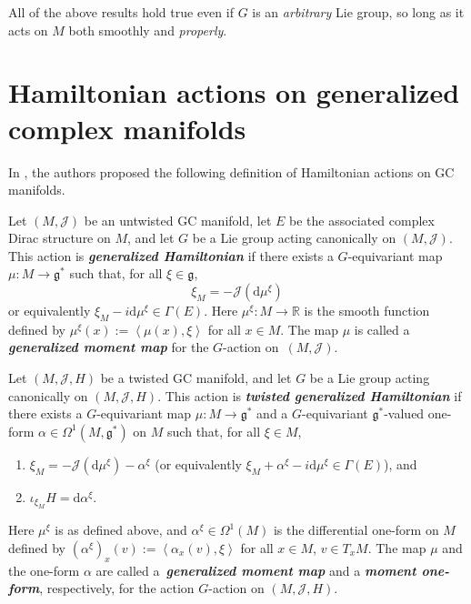 \documentclass[11pt]{article}
\numberwithin{equation}{section}
\newcommand{\deff}[1]{\textbf{\emph{#1}}}
\newcommand{\func}[3]{#1 \colon #2 \to #3}
\newcommand{\tang}{T}
\newcommand{\iprod}[2]{\left\langle {#1} , {#2} \right\rangle}
\begin{document}
\begin{Remark}
All of the above results hold true even if $G$ is an \emph{arbitrary} Lie group, so long as it acts on $M$ both smoothly and \emph{properly}.
\end{Remark}


\section{Hamiltonian actions on generalized complex manifolds}\label{section3}


In \cite{lintolman}, the authors proposed the following def\/inition of Hamiltonian actions on GC manifolds.


\begin{Definition}
\label{genhamactiondef}

Let $(M,\mathcal{J})$ be an untwisted GC manifold, let $E$ be the associated complex Dirac structure on $M$, and let $G$ be a Lie group acting canonically on $(M,\mathcal{J})$.  This action is \deff{generalized Hamiltonian} if there exists a $G$-equivariant map $\func{\mu}{M}{\mathfrak{g}^{\ast}}$ such that, for all $\xi \in \mathfrak{g}$,
\[
  \xi_M = - \mathcal{J} ( \mathrm{d} \mu^{\xi} )
\]
or equivalently $\xi_M - i \mathrm{d} \mu^{\xi} \in \Gamma(E)$.
Here $\func{\mu^{\xi}}{M}{\mathbb{R}}$ is the smooth function def\/ined by $\mu^{\xi}(x) := \iprod{\mu(x)}{\xi}$ for all $x \in M$.  The map $\mu$ is called a \deff{generalized moment map} for the $G$-action on~$(M, \mathcal{J})$.



Let $(M,\mathcal{J},H)$ be a twisted GC manifold, and let $G$ be a Lie group acting canonically on $(M,\mathcal{J},H)$.  This action is \deff{twisted generalized Hamiltonian} if there exists a $G$-equivariant map $\func{\mu}{M}{\mathfrak{g}^{\ast}}$ and a $G$-equivariant $\mathfrak{g}^*$-valued one-form $\alpha \in \Omega^1(M, \mathfrak{g}^{\ast})$ on $M$ such that, for all $\xi \in M$,
\begin{enumerate}\itemsep=0pt
  \item $\xi_M = - \mathcal{J} ( \mathrm{d} \mu^{\xi} ) - \alpha^{\xi}$ (or equivalently $\xi_M + \alpha^{\xi} - i \mathrm{d} \mu^{\xi} \in \Gamma(E)$), and
  \item $\iota_{\xi_M} H = \mathrm{d} \alpha^{\xi}$.
\end{enumerate}
Here $\mu^{\xi}$ is as def\/ined above, and $\alpha^{\xi} \in \Omega^1(M)$ is the dif\/ferential one-form on $M$ def\/ined by $(\alpha^{\xi})_x (v) := \iprod{\alpha_x(v)}{\xi}$ for all $x \in M$, $v \in \tang_x M$.  The map $\mu$ and the one-form $\alpha$ are called a~\deff{generalized moment map} and a \deff{moment one-form}, respectively, for the action $G$-action on $(M, \mathcal{J}, H)$.
\end{Definition}
\end{document}
